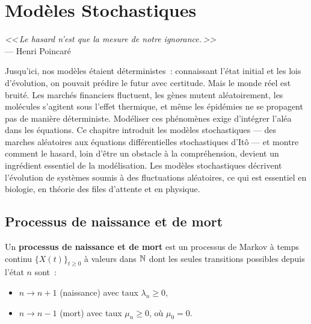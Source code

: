\chapter{Mod\`eles Stochastiques}
\label{ch:stochastiques}

\begin{center}
\textit{<<\,Le hasard n'est que la mesure de notre ignorance.\,>>}\\[4pt]
--- Henri Poincar\'e
\end{center}

\bigskip

Jusqu'ici, nos mod\`eles \'etaient d\'eterministes~: connaissant l'\'etat initial et les lois d'\'evolution, on pouvait pr\'edire le futur avec certitude. Mais le monde r\'eel est bruit\'e. Les march\'es financiers fluctuent, les g\`enes mutent al\'eatoirement, les mol\'ecules s'agitent sous l'effet thermique, et m\^eme les \'epid\'emies ne se propagent pas de mani\`ere d\'eterministe. Mod\'eliser ces ph\'enom\`enes exige d'int\'egrer l'al\'ea dans les \'equations. Ce chapitre introduit les mod\`eles stochastiques --- des marches al\'eatoires aux \'equations diff\'erentielles stochastiques d'It\^o --- et montre comment le hasard, loin d'\^etre un obstacle \`a la compr\'ehension, devient un ingr\'edient essentiel de la mod\'elisation. Les mod\`eles stochastiques d\'ecrivent l'\'evolution de syst\`emes soumis
\`a des fluctuations al\'eatoires, ce qui est essentiel en biologie,
en th\'eorie des files d'attente et en physique.

\section{Processus de naissance et de mort}
\label{sec:naissance_mort}

\begin{definition}
Un \textbf{processus de naissance et de mort} est un processus
de Markov \`a temps continu $\{X(t)\}_{t \geq 0}$ \`a valeurs dans $\mathbb{N}$
dont les seules transitions possibles depuis l'\'etat $n$ sont~:
\begin{itemize}
  \item $n \to n+1$ (naissance) avec taux $\lambda_n \geq 0$,
  \item $n \to n-1$ (mort) avec taux $\mu_n \geq 0$, o\`u $\mu_0 = 0$.
\end{itemize}
\end{definition}

